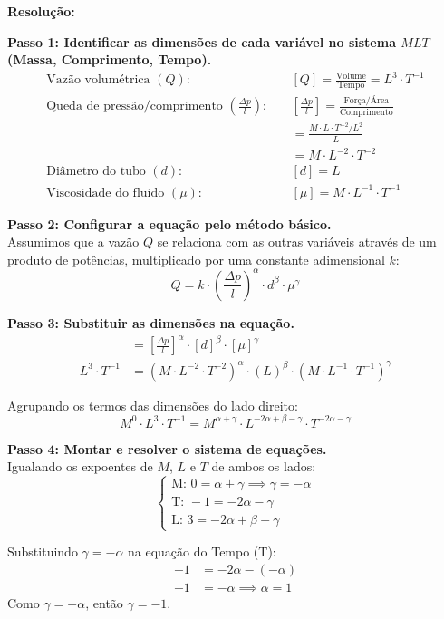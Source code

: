 \textbf{Resolução:}

\textbf{Passo 1: Identificar as dimensões de cada variável no sistema $MLT$ (Massa, Comprimento, Tempo).}
\begin{align*}
\text{Vazão volumétrica } (Q): \quad &[Q] = \frac{\text{Volume}}{\text{Tempo}} = L^3 \cdot T^{-1} \\
\text{Queda de pressão/comprimento } \left(\frac{\Delta p}{l}\right): \quad &\left[\frac{\Delta p}{l}\right] = \frac{\text{Força/Área}}{\text{Comprimento}} \\
&= \frac{M \cdot L \cdot T^{-2} / L^2}{L} \\
&= M \cdot L^{-2} \cdot T^{-2} \\
\text{Diâmetro do tubo } (d): \quad &[d] = L \\
\text{Viscosidade do fluido } (\mu): \quad &[\mu] = M \cdot L^{-1} \cdot T^{-1}
\end{align*}

\textbf{Passo 2: Configurar a equação pelo método básico.} \\
Assumimos que a vazão $Q$ se relaciona com as outras variáveis através de um produto de potências, multiplicado por uma constante adimensional $k$:
\[ Q = k \cdot \left(\frac{\Delta p}{l}\right)^\alpha \cdot d^\beta \cdot \mu^\gamma \]

\textbf{Passo 3: Substituir as dimensões na equação.}
\begin{align*}
[Q] &= \left[\frac{\Delta p}{l}\right]^\alpha \cdot [d]^\beta \cdot [\mu]^\gamma \\
L^3 \cdot T^{-1} &= (M \cdot L^{-2} \cdot T^{-2})^\alpha \cdot (L)^\beta \cdot (M \cdot L^{-1} \cdot T^{-1})^\gamma
\end{align*}

Agrupando os termos das dimensões do lado direito:
\[ M^0 \cdot L^3 \cdot T^{-1} = M^{\alpha+\gamma} \cdot L^{-2\alpha+\beta-\gamma} \cdot T^{-2\alpha-\gamma} \]

\textbf{Passo 4: Montar e resolver o sistema de equações.} \\
Igualando os expoentes de $M$, $L$ e $T$ de ambos os lados:
\[
\begin{cases}
\text{M: } 0 = \alpha + \gamma \implies \gamma = -\alpha \\
\text{T: } -1 = -2\alpha - \gamma \\
\text{L: } 3 = -2\alpha + \beta - \gamma
\end{cases}
\]

Substituindo $\gamma = -\alpha$ na equação do Tempo (T):
\begin{align*}
-1 &= -2\alpha - (-\alpha) \\
-1 &= -\alpha \implies \alpha = 1
\end{align*}
Como $\gamma = -\alpha$, então $\gamma = -1$.

